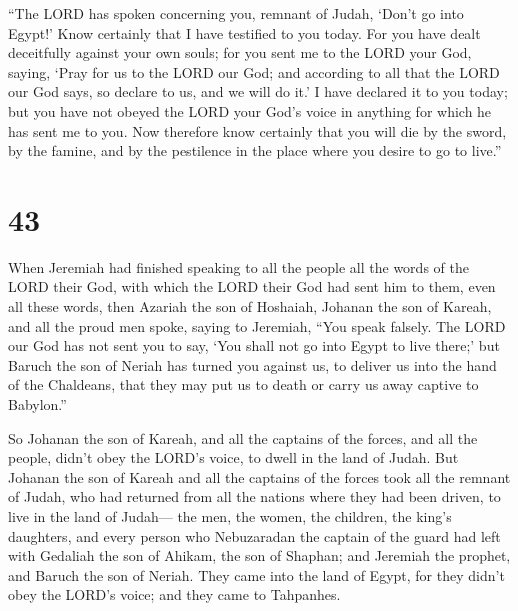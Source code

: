  ``The LORD has spoken concerning you, remnant of Judah,
`Don't go into Egypt!' Know certainly that I have testified to you
today.  For you have dealt deceitfully against your own
souls; for you sent me to the LORD your God, saying, `Pray for us to the
LORD our God; and according to all that the LORD our God says, so
declare to us, and we will do it.'  I have declared it to
you today; but you have not obeyed the LORD your God's voice in anything
for which he has sent me to you.  Now therefore know
certainly that you will die by the sword, by the famine, and by the
pestilence in the place where you desire to go to live.''

\hypertarget{section-42}{%
\section{43}\label{section-42}}

 When Jeremiah had finished speaking to all the people all
the words of the LORD their God, with which the LORD their God had sent
him to them, even all these words,  then Azariah the son of
Hoshaiah, Johanan the son of Kareah, and all the proud men spoke, saying
to Jeremiah, ``You speak falsely. The LORD our God has not sent you to
say, `You shall not go into Egypt to live there;'  but
Baruch the son of Neriah has turned you against us, to deliver us into
the hand of the Chaldeans, that they may put us to death or carry us
away captive to Babylon.''

 So Johanan the son of Kareah, and all the captains of the
forces, and all the people, didn't obey the LORD's voice, to dwell in
the land of Judah.  But Johanan the son of Kareah and all
the captains of the forces took all the remnant of Judah, who had
returned from all the nations where they had been driven, to live in the
land of Judah---  the men, the women, the children, the
king's daughters, and every person who Nebuzaradan the captain of the
guard had left with Gedaliah the son of Ahikam, the son of Shaphan; and
Jeremiah the prophet, and Baruch the son of Neriah.  They
came into the land of Egypt, for they didn't obey the LORD's voice; and
they came to Tahpanhes.

